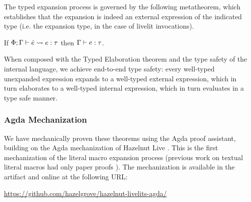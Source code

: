 The typed expansion process is governed by the following metatheorem, which establishes that the expansion
is indeed an external expression of the indicated type (i.e. the expansion type, in the case of livelit invocations).
\begin{theorem}
    If $\Phi; \Gamma \vdash \hat e \leadsto e : \tau$ then $\Gamma \vdash e : \tau$.
\end{theorem}

When composed with the Typed Elaboration theorem and the type safety of the internal
language, we achieve end-to-end type safety: every well-typed unexpanded
expression expands to a well-typed external expression, which in turn elaborates to a well-typed internal
expression, which in turn evaluates in a type safe manner.

\subsubsection{Agda Mechanization}
\label{sec:agda}
We have mechanically proven these theorems 
using the Agda proof assistant, building on the Agda mechanization 
of Hazelnut Live \cite{HazelnutLive}. 
This is the first mechanization of the literal macro expansion 
process 
(previous work on textual literal macros had only paper proofs \cite{TLMs}). 
The mechanization is available
in the artifact and online at the following URL: 

\begin{center}
\url{https://github.com/hazelgrove/hazelnut-livelits-agda/}
\end{center}

